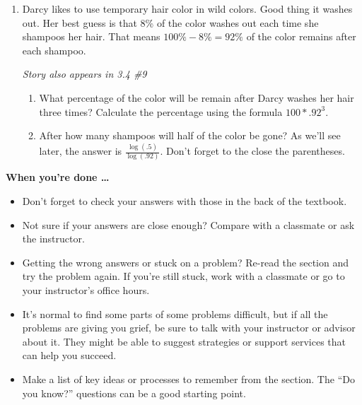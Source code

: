 \begin{enumerate}
\item Darcy likes to use temporary hair color in wild colors.  Good thing it washes out.  Her best guess is that 8\% of the color washes out each time she shampoos her hair.   That means $100\% - 8\% = 92\%$ of the color remains after each shampoo.

\hfill \emph{Story also appears in 3.4 \#9}
\begin{enumerate}
\item What percentage of the color will be remain after Darcy washes her hair three times?  Calculate the percentage using the formula $100 \ast .92^3$.  
\item After how many shampoos will half of the color be gone?  As we'll see later, the answer is $\displaystyle \frac{\log(.5)}{\log(.92)}$.  Don't forget to the close the parentheses. 
\end{enumerate}
 

\end{enumerate}

\bigskip

\noindent \textbf{When you're done \ldots}

\begin{itemize}
\item Don't forget to check your answers with those in the back of the textbook. 
\item Not sure if your answers are close enough? Compare with a classmate or ask the instructor.  
\item Getting the wrong answers or stuck on a problem?  Re-read the section and try the problem again.   If you're still stuck, work with a classmate or go to your instructor's office hours.
\item It's normal to find some parts of some problems difficult, but if all the problems are giving you grief, be sure to talk with your instructor or advisor about it.  They might be able to suggest strategies or support services that can help you succeed.
\item Make a list of key ideas or processes to remember from the section.  The ``Do you know?'' questions can be a good starting point.
\end{itemize}

